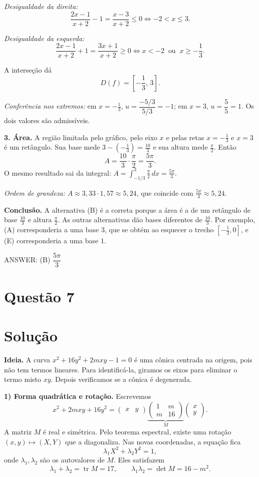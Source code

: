 \documentclass{article}%
\begin{document}
\emph{Desigualdade da direita:}
\[
\frac{2x-1}{x+2}-1=\frac{x-3}{x+2}\le 0 \iff -2<x\le 3 .
\]

\emph{Desigualdade da esquerda:}
\[
\frac{2x-1}{x+2}+1=\frac{3x+1}{x+2}\ge 0 \iff x<-2 \ \text{ ou } \ x\ge -\frac{1}{3}.
\]

A interseção dá
\[
D(f)=\left[-\frac{1}{3},\,3\right].
\]

\emph{Conferência nos extremos:} em $x=-\frac13$, $u=\dfrac{-5/3}{5/3}=-1$; em $x=3$, $u=\dfrac{5}{5}=1$. Os dois valores são admissíveis.

\textbf{3. Área.} A região limitada pelo gráfico, pelo eixo $x$ e pelas retas $x=-\frac13$ e $x=3$ é um retângulo. Sua base mede $3-\left(-\frac13\right)=\frac{10}{3}$ e sua altura mede $\frac{\pi}{2}$. Então
\[
A=\frac{10}{3}\cdot\frac{\pi}{2}=\frac{5\pi}{3}.
\]
O mesmo resultado sai da integral: $A=\displaystyle\int_{-1/3}^{3}\frac{\pi}{2}\,dx=\frac{5\pi}{3}$.

\emph{Ordem de grandeza:} $A\approx 3{,}33\cdot 1{,}57\approx 5{,}24$, que coincide com $\frac{5\pi}{3}\approx 5{,}24$.

\textbf{Conclusão.} A alternativa (B) é a correta porque a área é a de um retângulo de base $\frac{10}{3}$ e altura $\frac{\pi}{2}$. As outras alternativas dão bases diferentes de $\frac{10}{3}$. Por exemplo, (A) corresponderia a uma base $3$, que se obtém ao esquecer o trecho $\left[-\frac13,0\right]$, e (E) corresponderia a uma base $1$.

ANSWER: (B) $\dfrac{5\pi}{3}$%
\newpage%
\section*{Questão 7}

\section*{Solução}

\textbf{Ideia.} A curva $x^2+16y^2+2mxy-1=0$ é uma cônica centrada na origem, pois não tem termos lineares. Para identificá-la, giramos os eixos para eliminar o termo misto $xy$. Depois verificamos se a cônica é degenerada.

\textbf{1) Forma quadrática e rotação.} Escrevemos
\[
x^2+2mxy+16y^2=\begin{pmatrix}x & y\end{pmatrix}
\underbrace{\begin{pmatrix}1 & m\\ m & 16\end{pmatrix}}_{M}
\begin{pmatrix}x\\ y\end{pmatrix}.
\]
A matriz $M$ é real e simétrica. Pelo teorema espectral, existe uma rotação $(x,y)\mapsto(X,Y)$ que a diagonaliza. Nas novas coordenadas, a equação fica
\[
\lambda_1X^2+\lambda_2Y^2=1,
\]
onde $\lambda_1,\lambda_2$ são os autovalores de $M$. Eles satisfazem
\[
\lambda_1+\lambda_2=\operatorname{tr}M=17,\qquad
\lambda_1\lambda_2=\det M=16-m^2 .
\]
\end{document}
